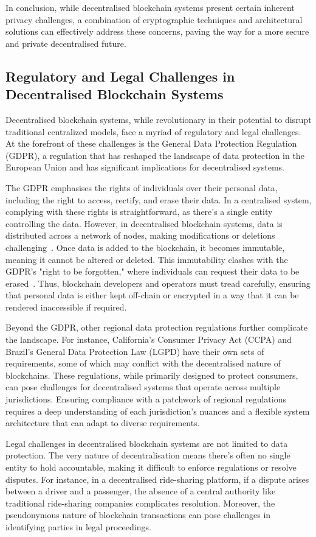 In conclusion, while decentralised blockchain systems present certain inherent privacy challenges, a combination of cryptographic techniques and architectural solutions can effectively address these concerns, paving the way for a more secure and private decentralised future.

\subsection{Regulatory and Legal Challenges in Decentralised Blockchain Systems}
Decentralised blockchain systems, while revolutionary in their potential to disrupt traditional centralized models, face a myriad of regulatory and legal challenges. At the forefront of these challenges is the General Data Protection Regulation (GDPR), a regulation that has reshaped the landscape of data protection in the European Union and has significant implications for decentralised systems.

The GDPR emphasises the rights of individuals over their personal data, including the right to access, rectify, and erase their data. In a centralised system, complying with these rights is straightforward, as there's a single entity controlling the data. However, in decentralised blockchain systems, data is distributed across a network of nodes, making modifications or deletions challenging~\cite{Schwerin.2018}. Once data is added to the blockchain, it becomes immutable, meaning it cannot be altered or deleted. This immutability clashes with the GDPR's "right to be forgotten," where individuals can request their data to be erased~\cite{BelenSaglam.}. Thus, blockchain developers and operators must tread carefully, ensuring that personal data is either kept off-chain or encrypted in a way that it can be rendered inaccessible if required.

Beyond the GDPR, other regional data protection regulations further complicate the landscape. For instance, California's Consumer Privacy Act (CCPA) and Brazil's General Data Protection Law (LGPD) have their own sets of requirements, some of which may conflict with the decentralised nature of blockchains. These regulations, while primarily designed to protect consumers, can pose challenges for decentralised systems that operate across multiple jurisdictions. Ensuring compliance with a patchwork of regional regulations requires a deep understanding of each jurisdiction's nuances and a flexible system architecture that can adapt to diverse requirements.

Legal challenges in decentralised blockchain systems are not limited to data protection. The very nature of decentralisation means there's often no single entity to hold accountable, making it difficult to enforce regulations or resolve disputes. For instance, in a decentralised ride-sharing platform, if a dispute arises between a driver and a passenger, the absence of a central authority like traditional ride-sharing companies complicates resolution. Moreover, the pseudonymous nature of blockchain transactions can pose challenges in identifying parties in legal proceedings.

